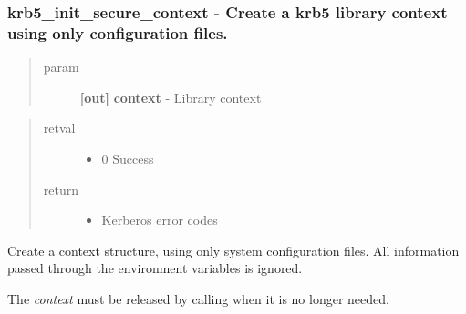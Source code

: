 \documentclass[letterpaper,10pt,english]{sphinxmanual}
\begin{document}
\subsubsection{krb5\_init\_secure\_context -  Create a krb5 library context using only configuration files.}
\label{appdev/refs/api/krb5_init_secure_context::doc}\label{appdev/refs/api/krb5_init_secure_context:krb5-init-secure-context-create-a-krb5-library-context-using-only-configuration-files}

\begin{fulllineitems}
\label{appdev/refs/api/krb5_init_secure_context:krb5_init_secure_context}
\end{fulllineitems}

\begin{quote}\begin{description}
\item[{param}] \leavevmode
\textbf{{[}out{]}} \textbf{context} - Library context

\end{description}\end{quote}
\begin{quote}\begin{description}
\item[{retval}] \leavevmode\begin{itemize}
\item {} 
0   Success

\end{itemize}

\item[{return}] \leavevmode\begin{itemize}
\item {} 
Kerberos error codes

\end{itemize}

\end{description}\end{quote}

Create a context structure, using only system configuration files. All information passed through the environment variables is ignored.

The \emph{context} must be released by calling {\hyperref[appdev/refs/api/krb5_free_context:krb5_free_context]{}} when it is no longer needed.
\end{document}
